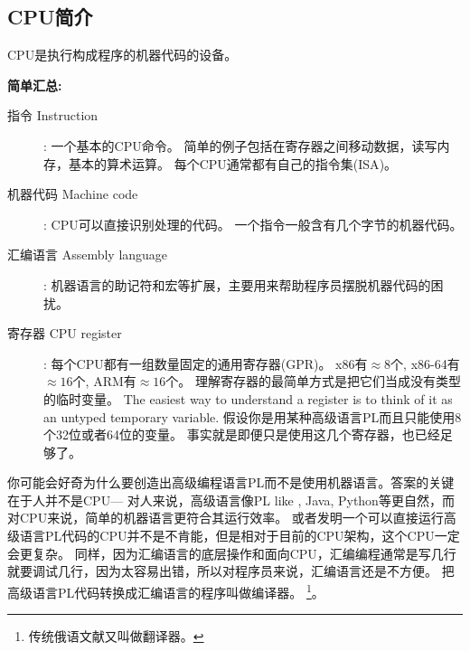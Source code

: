 \documentclass[UTF8,nofonts]{ctexart}
\begin{document}

\subsection{CPU简介}

\ac{CPU}是执行构成程序的机器代码的设备。

\textbf{简单汇总:}

\begin{description}
\item[指令 Instruction]: 一个基本的\ac{CPU}命令。
简单的例子包括在寄存器之间移动数据，读写内存，基本的算术运算。
每个\ac{CPU}通常都有自己的指令集(\ac{ISA})。

\item[机器代码 Machine code]: \ac{CPU}可以直接识别处理的代码。
一个指令一般含有几个字节的机器代码。 
\item[汇编语言 Assembly language]: 机器语言的助记符和宏等扩展，主要用来帮助程序员摆脱机器代码的困扰。
\item[寄存器 CPU register]: 每个\ac{CPU}都有一组数量固定的通用寄存器(\ac{GPR})。
x86有$\approx 8$个, x86-64有$\approx 16$个, ARM有$\approx 16$个。
理解寄存器的最简单方式是把它们当成没有类型的临时变量。
The easiest way to understand a register is to think of it as an untyped temporary variable.
假设你是用某种高级语言\ac{PL}而且只能使用8个32位或者64位的变量。
事实就是即便只是使用这几个寄存器，也已经足够了。
\end{description}


你可能会好奇为什么要创造出高级编程语言\ac{PL}而不是使用机器语言。答案的关键在于人并不是\ac{CPU}---%
对人来说，高级语言像\ac{PL} like \CCpp, Java, Python等更自然，而对\ac{CPU}来说，简单的机器语言更符合其运行效率。
或者发明一个可以直接运行高级语言\ac{PL}代码的\ac{CPU}并不是不肯能，但是相对于目前的\ac{CPU}架构，这个\ac{CPU}一定会更复杂。
同样，因为汇编语言的底层操作和面向\ac{CPU}，汇编编程通常是写几行就要调试几行，因为太容易出错，所以对程序员来说，汇编语言还是不方便。
把高级语言\ac{PL}代码转换成汇编语言的程序叫做编译器。
\footnote{传统俄语文献又叫做翻译器。}。

%
%
%
\end{document}
